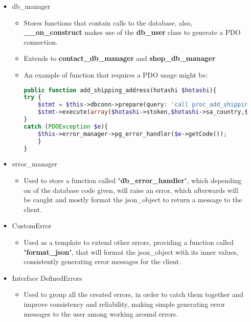 \begin{flushleft}
\begin{itemize}
        \item db\_manager
        \begin{itemize}
            \item Stores functions that contain calls to the database, also, \textbf{\_\_on\_construct} makes use of the \textbf{db\_user}  class to generate a PDO connection.
            \item Extends to \textbf{contact\_db\_manager} and \textbf{shop\_db\_manager}
            \item \begin{flushleft}
                An example of function that requires a PDO usage might be:
                \begin{lstlisting}[language=php,label={lst:php_pdo_query_example}]
public function add_shipping_address(hotashi $hotashi){
try {
    $stmt = $this->dbconn->prepare(query: 'call proc_add_shipping_address_from_stoken(?,?,?,?,?,?,?);');
    $stmt->execute(array($hotashi->stoken,$hotashi->sa_country,$hotashi->sa_city,$hotashi->sa_pcode,$hotashi->sa_add1,$hotashi->sa_add2,$hotashi->sa_add3));
}
catch (PDOException $e){
    $this->error_manager->pg_error_handler($e->getCode());
    }
}
                \end{lstlisting}
            \end{flushleft}
        \end{itemize}
    \end{itemize}
    \begin{itemize}
        \item error\_manager
        \begin{itemize}
            \item Used to store a function called "\textbf{db\_error\_handler}", which depending on of the database
            code given, will raise an error, which afterwards will be caught and mostly format the json\_object to
            return a message to the client.
        \end{itemize}
    \end{itemize}
    \begin{itemize}
        \item CustomError
        \begin{itemize}
            \item Used as a template to extend other errors, providing a function called "\textbf{format\_json}", that
            will format the json\_object with its inner values, consistently generating error messages for the client.
        \end{itemize}
    \end{itemize}
    \begin{itemize}
        \item Interface DefinedErrors
        \begin{itemize}
            \item Used to group all the created errors, in order to catch them together and improve consistency and
            reliability, making simple generating error messages to the user among working around errors.
        \end{itemize}
    \end{itemize}
\end{flushleft}
